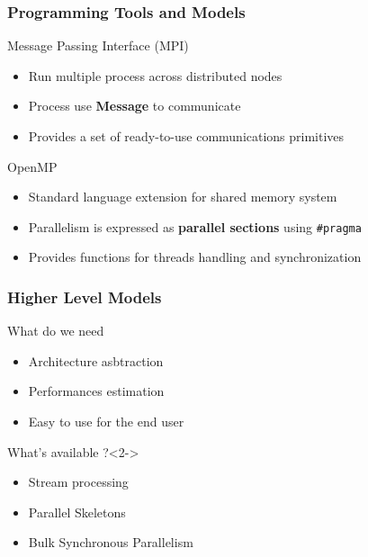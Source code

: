 \frame
{
  \frametitle{Programming Tools and Models}
  \begin{block}{Message Passing Interface (MPI)}
  \begin{itemize}
  \footnotesize
  \item Run multiple process across distributed nodes
  \item Process use \textbf{Message} to communicate
  \item Provides a set of ready-to-use communications primitives
 \end{itemize}
  \end{block}{}

  \begin{block}{OpenMP}
  \begin{itemize}
  \footnotesize
  \item Standard language extension for shared memory system
  \item Parallelism is expressed as \textbf{parallel sections} using \texttt{\#pragma}
  \item Provides functions for threads handling and synchronization
 \end{itemize}
  \end{block}{}
}

\frame
{
  \frametitle{Higher Level Models}
  \begin{block}{What do we need}
  \begin{itemize}
  \footnotesize
  \item Architecture asbtraction
  \item Performances estimation
  \item Easy to use for the end user
 \end{itemize}
  \end{block}{}

  \begin{block}{What's available ?}<2->
  \begin{itemize}
  \footnotesize
  \item Stream processing
  \item Parallel Skeletons
  \item \alert<3->{Bulk Synchronous Parallelism}
 \end{itemize}
  \end{block}{}
}

